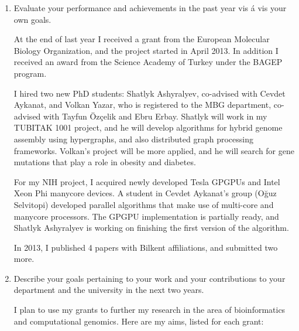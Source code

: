 \begin{enumerate}

\item Evaluate your performance and achievements in the past year vis á vis your own goals. 

At the end of last year I received a grant from the European Molecular Biology Organization, and the project started in April 2013. In addition I received an award from the Science Academy of Turkey under the BAGEP program. 

I hired two new PhD students: Shatlyk Ashyralyev, co-advised with Cevdet Aykanat, and Volkan Yazar, who is registered to the MBG department, co-advised with Tayfun Özçelik and Ebru Erbay. Shatlyk will work in my TUBITAK 1001 project, and he will develop algorithms for hybrid genome assembly using hypergraphs, and also distributed graph processing frameworks. Volkan's project will be more applied, and he will search for gene mutations that play a role in obesity and diabetes.

For my NIH project, I acquired newly developed Tesla GPGPUs and Intel Xeon Phi manycore devices. A student in Cevdet Aykanat's group (Oğuz Selvitopi) developed parallel algorithms that make use of multi-core and manycore processors. The GPGPU implementation is partially ready, and Shatlyk Ashyralyev is working on finishing the first version of the algorithm.

In 2013, I published 4 papers with Bilkent affiliations, and submitted two more. 


\item Describe your goals pertaining to your work and your contributions to your department and the university in the next two years. 

I plan to use my grants to further my research in the area of bioinformatics and computational genomics. Here are my aims, listed for each grant:

\begin{enumerate}


\end{enumerate}
\end{enumerate}
